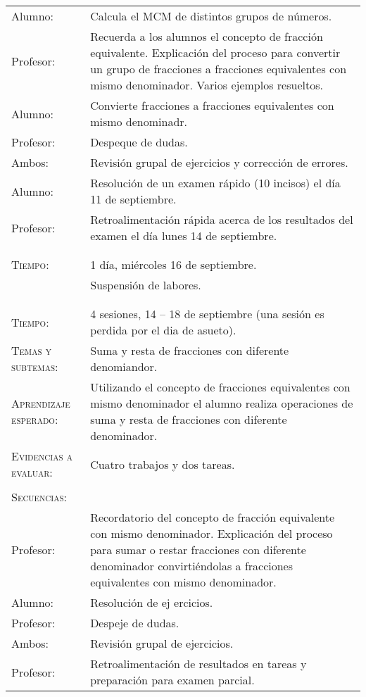 \documentclass[letterpaper,10pt]{article}
\begin{document}
\newpage

\begin{tabular}[t]{R{0.25\textwidth}p{0.71\textwidth}}
    Alumno: & Calcula el MCM de distintos grupos de n\'umeros. \\ Profesor: &
    Recuerda a los alumnos el concepto de fracci\'on equivalente. Explicaci\'on
    del proceso para convertir un grupo de fracciones a fracciones equivalentes
    con mismo denominador. Varios ejemplos resueltos. \\ Alumno: & Convierte
    fracciones a fracciones equivalentes con mismo denominadr. \\ Profesor: &
    Despeque de dudas. \\ Ambos: & Revisi\'on grupal de ejercicios y
    correcci\'on de errores. \\ Alumno: & Resoluci\'on de un examen r\'apido (10
    incisos) el d\'ia 11 de septiembre. \\ Profesor: & Retroalimentaci\'on
    r\'apida acerca de los resultados del examen el d\'ia lunes 14 de
    septiembre. \\

\\ \hline \\
 
    \textsc{Tiempo:}& 1 d\'ia, mi\'ercoles 16 de septiembre. \\
                    & {\Large \sc Suspensi\'on de labores. } \\ 
\\ \hline \\
    
    \textsc{Tiempo:}                    & 4 sesiones, 14 -- 18 de septiembre
    (una sesi\'on es perdida por el dia de asueto). \\
    \textsc{Temas y subtemas:}          & Suma y resta de fracciones con
    diferente denomiandor. \\
    \textsc{Aprendizaje esperado: }     & Utilizando el concepto de fracciones
    equivalentes con mismo denominador el alumno realiza operaciones de suma y
    resta de fracciones con diferente denominador. \\
    \textsc{Evidencias a evaluar:}      & Cuatro trabajos y dos tareas. \\\\
    \textsc{\large Secuencias:} \\
    Profesor: & Recordatorio del concepto de fracci\'on equivalente con mismo
    denominador. Explicaci\'on del proceso para sumar o restar fracciones con
    diferente denominador convirti\'endolas a fracciones equivalentes con mismo
    denominador. \\ Alumno: & Resoluci\'on de ej ercicios. \\ Profesor: &
    Despeje de dudas. \\ Ambos: & Revisi\'on grupal de ejercicios. \\ Profesor: &
    Retroalimentaci\'on de resultados en tareas y preparaci\'on para examen parcial. \\
    


\end{tabular}
\end{document}
